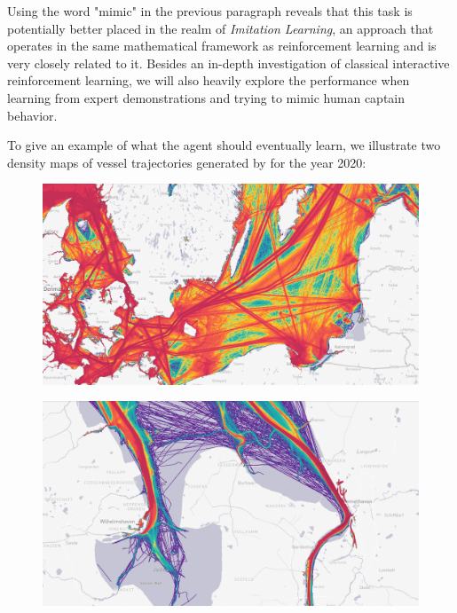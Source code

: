 \par
Using the word "mimic" in the previous paragraph reveals that this task is potentially better placed in the realm of \textit{Imitation Learning}, an approach that operates in the same mathematical framework as reinforcement learning and is very closely related to it. Besides an in-depth investigation of classical interactive reinforcement learning, we will also heavily explore the performance when learning from expert demonstrations and trying to mimic human captain behavior.
\par
To give an example of what the agent should eventually learn, we illustrate two density maps of vessel trajectories generated by \cite{martinetraffic} for the year 2020:
\begin{figure}[H]
    \centering
    \begin{minipage}{.47\textwidth}
      \centering
      \includegraphics[width=\textwidth]{images/balticsea_density_routes.PNG}
      \label{fig:baltic}
    \end{minipage}
    \hspace{.05\textwidth}%
    \begin{minipage}{.47\textwidth}
        \centering
        \includegraphics[width=\textwidth]{images/bhv_jadebusen_density_routes.PNG}
        \label{fig:jadebusen}
      \end{minipage}
\end{figure}
